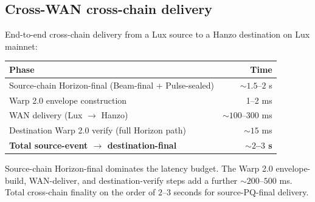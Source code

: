 \subsection{Cross-WAN cross-chain delivery}

End-to-end cross-chain delivery from a Lux source to a Hanzo destination on Lux mainnet:

\begin{tabular}{@{}lr@{}}
  \toprule
  \textbf{Phase} & \textbf{Time} \\
  \midrule
  Source-chain Horizon-final (Beam-final + Pulse-sealed)  & $\sim 1.5$--$2$ s \\
  Warp 2.0 envelope construction                          & 1--2 ms \\
  WAN delivery (Lux $\to$ Hanzo)                          & $\sim 100$--$300$ ms \\
  Destination Warp 2.0 verify (full Horizon path)         & $\sim 15$ ms \\
  \midrule
  \textbf{Total source-event $\to$ destination-final}     & \textbf{$\sim 2$--$3$ s} \\
  \bottomrule
\end{tabular}

Source-chain Horizon-final dominates the latency budget. The Warp 2.0 envelope-build, WAN-deliver, and destination-verify steps add a further $\sim 200$--$500$ ms. Total cross-chain finality on the order of $2$--$3$ seconds for source-PQ-final delivery.
